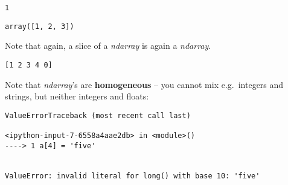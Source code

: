 \documentclass[english,serif,mathserif,xcolor=pdftex,dvipsnames,table]{beamer}
\begin{document}
\begin{verbatim}
1
\end{verbatim}

\begin{Shaded}
\begin{Highlighting}[]
\NormalTok{a[}\NormalTok{:}\NormalTok{]}
\end{Highlighting}
\end{Shaded}

\begin{verbatim}
array([1, 2, 3])
\end{verbatim}

Note that again, a slice of a \emph{ndarray} is again a \emph{ndarray}.

\begin{Shaded}
\begin{Highlighting}[]
\NormalTok{a[}\NormalTok{] }\OperatorTok{=} 
\end{Highlighting}
\end{Shaded}

\begin{Shaded}
\begin{Highlighting}[]
\end{Highlighting}
\end{Shaded}

\begin{verbatim}
[1 2 3 4 0]
\end{verbatim}

Note that \emph{ndarray}'s are \textbf{homogeneous} -- you cannot mix
e.g.~integers and strings, but neither integers and floats:

\begin{Shaded}
\begin{Highlighting}[]
\NormalTok{a[}\NormalTok{] }\OperatorTok{=} 
\end{Highlighting}
\end{Shaded}

\begin{verbatim}
ValueErrorTraceback (most recent call last)

<ipython-input-7-6558a4aae2db> in <module>()
----> 1 a[4] = 'five'


ValueError: invalid literal for long() with base 10: 'five'
\end{verbatim}

\begin{Shaded}
\begin{Highlighting}[]
\NormalTok{a[}\NormalTok{] }\OperatorTok{=} 
\end{Highlighting}
\end{Shaded}
\end{document}
